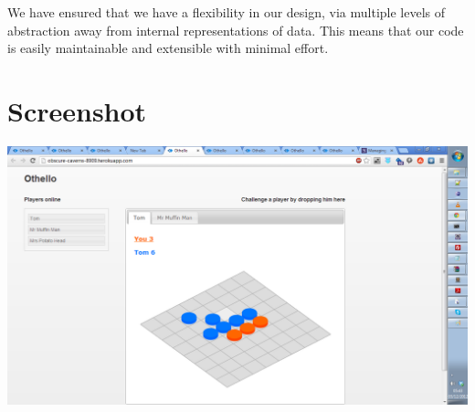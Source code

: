 \documentclass[a4wide, 11pt]{article}
\begin{document}
We have ensured that we have a flexibility in our design, via multiple levels of abstraction away from internal representations of data. This means that our code is easily maintainable and extensible with minimal effort.


\section{Screenshot}

\includegraphics[width=\textwidth]{Screenshot.png}
\end{document}
